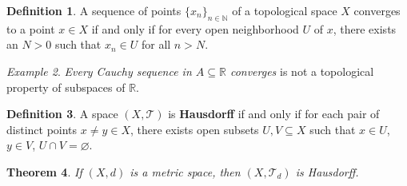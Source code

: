 \documentclass[ 12pt ]{article}
\newcounter{lecture_num}
\theoremstyle{plain}
\theoremstyle{plain}
\newtheorem{theorem}{Theorem}[lecture_num]
\theoremstyle{definition}
\newtheorem{definition}[theorem]{Definition}
\theoremstyle{remark}
\newtheorem{example}[theorem]{Example}
\begin{document}
\begin{definition}
	A sequence of points $\{ x_n \}_{n \in \mathbb{N}}$ of a topological space $X$ converges to a point $x \in X$ if and only if for every open neighborhood $U$ of $x$, there exists an
	$N > 0$ such that $x_n \in U$ for all $n > N$.
\end{definition}

\begin{example}
	\textit{Every Cauchy sequence in $A \subseteq \mathbb{R}$ converges} is not a topological property of subspaces of $\mathbb{R}$.
\end{example}

\begin{definition}
	A space $(X, \mathcal{T})$ is \textbf{Hausdorff} if and only if for each pair of distinct points $x \neq y \in X$, there exists open subsets $U, V \subseteq X$ such that $x \in U$,
	$y \in V$, $U \cap V = \varnothing$.
\end{definition}

\begin{theorem}
	If $(X, d)$ is a metric space, then $(X, \mathcal{T}_d)$ is Hausdorff.
\end{theorem}
\end{document}
